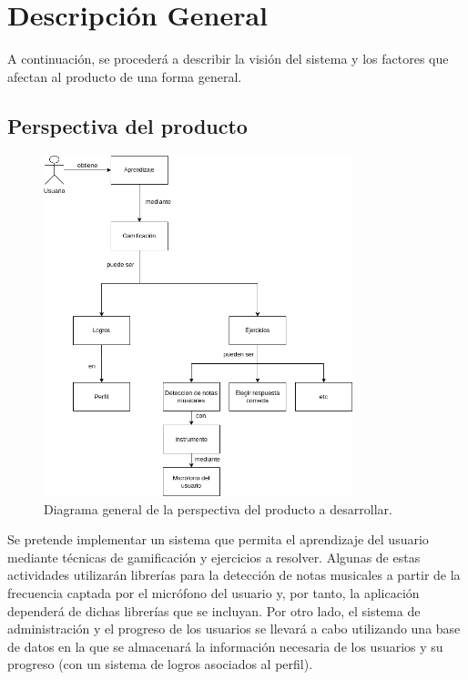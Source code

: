 \section{Descripción General}
A continuación, se procederá a describir la visión del sistema y los factores que afectan al producto de una forma general.

\subsection{Perspectiva del producto}
\begin{figure}[H]

    \centering
    \includegraphics[width=0.8\textwidth]{imagenes/c3/diagrama.png}
    \caption{Diagrama general de la perspectiva del producto a desarrollar.}
    \label{fig:artly}

\end{figure}
Se pretende implementar un sistema que permita el aprendizaje del usuario mediante técnicas de gamificación y ejercicios a resolver. Algunas de estas actividades utilizarán librerías para la detección de notas musicales
a partir de la frecuencia captada por el micrófono del usuario y, por tanto, la aplicación dependerá de dichas librerías que se incluyan.
Por otro lado, el sistema de administración y el progreso de los usuarios se llevará a cabo utilizando una base de datos en la que se almacenará la información necesaria de los usuarios y su progreso (con un sistema de logros asociados al perfil).



